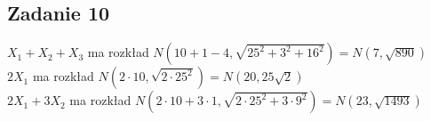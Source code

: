 \subsection{Zadanie 10}
$X_1 + X_2 + X_3$  ma rozkład $N(10+1-4,\sqrt{25^2 + 3^2 + 16^2}) = N(7,\sqrt{890})$ \\
$2X_1$  ma rozkład $N(2 \cdot 10,\sqrt{2 \cdot 25^2}) = N(20,25\sqrt{2})$ \\
$2X_1+3X_2$  ma rozkład $N(2 \cdot 10 + 3 \cdot 1,\sqrt{2 \cdot 25^2 + 3 \cdot 9^2}) = N(23,\sqrt{1493})$ \\
